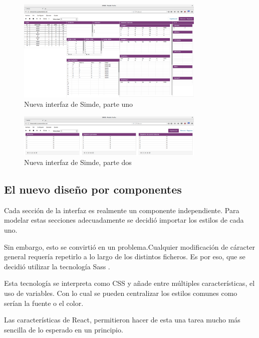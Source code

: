 \begin{figure}[!th]
\begin{center}
\includegraphics[width=0.8\textwidth]{images/cap5/simdenueva1.eps}
\caption{Nueva interfaz de Simde, parte uno}
\label{fig:Nueva interfaz de Simde, parte uno}
\end{center}
\end{figure}

\begin{figure}[!th]
\begin{center}
\includegraphics[width=0.8\textwidth]{images/cap5/simdenueva2.eps}
\caption{Nueva interfaz de Simde, parte dos}
\label{fig:Nueva interfaz de Simde, parte dos}
\end{center}
\end{figure}

\subsection{El nuevo diseño por componentes}

Cada sección de la interfaz es realmente un componente independiente. Para modelar estas secciones 
adecuadamente se decidió importar los estilos de cada uno.

\bigskip
Sin embargo, esto se convirtió en un problema.Cualquier modificación de cáracter general requería
repetirlo a lo largo de los distintos ficheros. Es por eso, que se decidió utilizar la tecnología
Sass \cite{Sass}.

\bigskip
Esta tecnología se interpreta como CSS y añade entre múltiples características, el uso de variables. 
Con lo cual se pueden centralizar los estilos comunes como serían la fuente o el color.

\bigskip
Las características de React, permitieron hacer de esta una tarea mucho más sencilla de lo esperado en 
un principio.